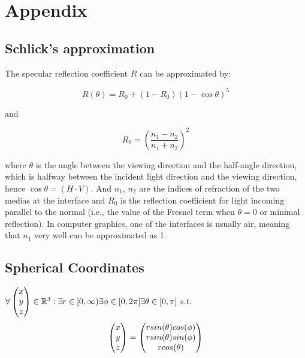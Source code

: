 \chapter{Appendix}
\section{Schlick's approximation}
The specular reflection coefficient $R$ can be approximated by:

\begin{equation}
 R(\theta) = R_0 + (1 - R_0)(1 - \cos \theta)^5
\label{eq:schlickapprox}
\end{equation}

and

\begin{equation*}
  R_0 = \left(\frac{n_1-n_2}{n_1+n_2}\right)^2
\end{equation*}

where $\theta$ is the angle between the viewing direction and the half-angle direction, which is halfway between the incident 
light direction and the viewing direction, hence $\cos\theta=(H\cdot V)$. And $n_1,\,n_2$ are the indices of refraction of the two medias at the interface and $R_0$ is the reflection coefficient for light incoming parallel to the normal (i.e., the value of the Fresnel term when $\theta = 0$ or minimal reflection). In computer graphics, one of the interfaces is usually air, meaning that $n_1$ very well can be approximated as 1.

\section{Spherical Coordinates}
$\forall \colvec[x]{y}{z} \in \mathbb{R}^3 : \exists r \in [0,\infty) \exists \phi \in [0,2\pi] \exists \theta \in [0,\pi] $ s.t.
\begin{equation*}
\colvec[x]{y}{z} = \colvec[r sin(\theta)cos(\phi)]{r sin(\theta)sin(\phi)}{r cos(\theta)}
\label{eq:sphericalcoordinates}
\end{equation*}





